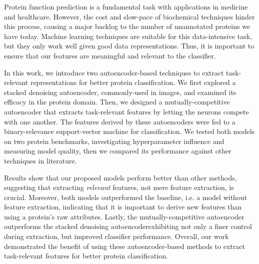 %
%
%
%
%

\par Protein function prediction is a fundamental task with applications in
medicine and healthcare. However, the cost and slow-pace of biochemical
techniques hinder this process, causing a major backlog to the number of
unannotated proteins we have today. Machine learning techniques are suitable
for this data-intensive task, but they only work well given good data
representations. Thus, it is important to ensure that our features are
meaningful and relevant to the classifier. 

\par In this work, we introduce two autoencoder-based techniques to extract
task-relevant representations for better protein classification. We first
explored a stacked denoising autoencoder, commonly-used in images, and examined
its efficacy in the protein domain. Then, we designed a mutually-competitive
autoencoder that extracts task-relevant features by letting the neurons compete
with one another. The features derived by these autoencoders were fed to a
binary-relevance support-vector machine for classification.  We tested both
models on two protein benchmarks, investigating hyperparameter influence and
measuring model quality, then we compared its performance against other
techniques in literature.

\par Results show that our proposed models perform better than other methods,
suggesting that extracting \emph{relevant} features, not mere feature
extraction, is crucial. Moreover, both models outperformed the baseline, i.e. a
model without feature extraction, indicating that it is important to derive new
features than using a protein's raw attributes.  Lastly, the
mutually-competitive autoencoder outperforms the stacked denoising
autoencoder\textemdash exhibiting not only a finer control during extraction,
but improved classifier performance.  Overall, our work demonstrated the
benefit of using these autoencoder-based methods to extract task-relevant
features for better protein classification.
